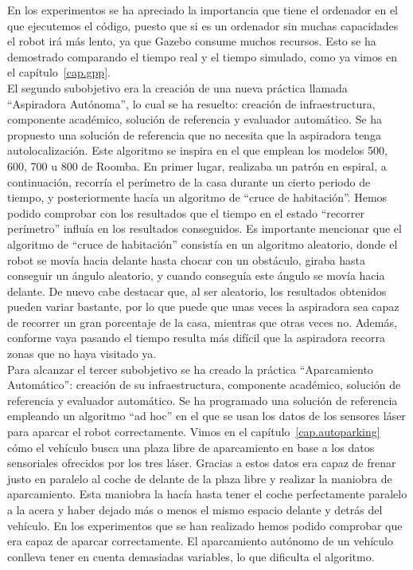 En los experimentos se ha apreciado la importancia que tiene el ordenador en el que ejecutemos el código, puesto que si es un ordenador sin muchas capacidades el robot irá más lento, ya que Gazebo consume muchos recursos. Esto se ha demostrado comparando el tiempo real y el tiempo simulado, como ya vimos en el capítulo~\ref{cap.gpp}.\\

El segundo subobjetivo era la creación de una nueva práctica llamada ``Aspiradora Autónoma'', lo cual se ha resuelto: creación de infraestructura, componente académico, solución de referencia y evaluador automático. Se ha propuesto una solución de referencia que no necesita que la aspiradora tenga autolocalización. Este algoritmo se inspira en el que emplean los modelos 500, 600, 700 u 800 de Roomba. En primer lugar, realizaba un patrón en espiral, a continuación, recorría el perímetro de la casa durante un cierto periodo de tiempo, y posteriormente hacía un algoritmo de ``cruce de habitación''. Hemos podido comprobar con los resultados que el tiempo en el estado ``recorrer perímetro'' influía en los resultados conseguidos. Es importante mencionar que el algoritmo de ``cruce de habitación'' consistía en un algoritmo aleatorio, donde el robot se movía hacia delante hasta chocar con un obstáculo, giraba hasta conseguir un ángulo aleatorio, y cuando conseguía este ángulo se movía hacia delante. De nuevo cabe destacar que, al ser aleatorio, los resultados obtenidos pueden variar bastante, por lo que puede que unas veces la aspiradora sea capaz de recorrer un gran porcentaje de la casa, mientras que otras veces no. Además, conforme vaya pasando el tiempo resulta más difícil que la aspiradora recorra zonas que no haya visitado ya.\\

Para alcanzar el tercer subobjetivo se ha creado la práctica ``Aparcamiento Automático'': creación de su infraestructura, componente académico, solución de referencia y evaluador automático. Se ha programado una solución de referencia empleando un algoritmo ``ad hoc'' en el que se usan los datos de los sensores láser para aparcar el robot correctamente. Vimos en el capítulo~\ref{cap.autoparking} cómo el vehículo busca una plaza libre de aparcamiento en base a los datos sensoriales ofrecidos por los tres láser. Gracias a estos datos era capaz de frenar justo en paralelo al coche de delante de la plaza libre y realizar la maniobra de aparcamiento. Esta maniobra la hacía hasta tener el coche perfectamente paralelo a la acera y haber dejado más o menos el mismo espacio delante y detrás del vehículo. En los experimentos que se han realizado hemos podido comprobar que era capaz de aparcar correctamente. El aparcamiento autónomo de un vehículo conlleva tener en cuenta demasiadas variables, lo que dificulta el algoritmo.\\

